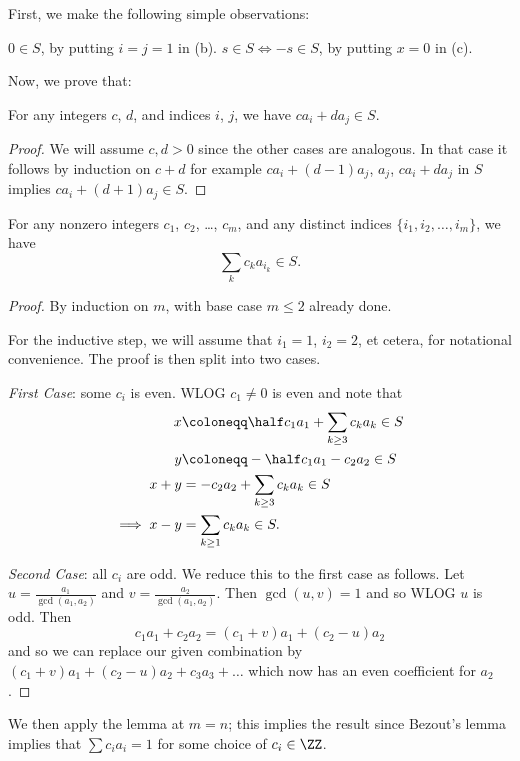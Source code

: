 \documentclass[11pt]{scrartcl}
\begin{document}
First, we make the following simple observations:
\begin{itemize}
  \ii $0 \in S$, by putting $i=j=1$ in (b).
  \ii $s \in S \iff -s \in S$, by putting $x=0$ in (c).
\end{itemize}

Now, we prove that:
\begin{lemma*}
  For any integers $c$, $d$, and indices $i$, $j$,
  we have $ca_i + da_j \in S$.
\end{lemma*}
\begin{proof}
  We will assume $c,d > 0$ since the other cases are analogous.
  In that case it follows by induction on $c+d$
  for example $ca_i + (d-1)a_j$, $a_j$, $ca_i + da_j$ in $S$
  implies $ca_i + (d+1)a_j \in S$.
\end{proof}

\begin{lemma*}
  For any nonzero integers $c_1$, $c_2$, \dots, $c_m$,
  and any distinct indices $\{i_1 , i_2 , \dots , i_m\}$, we have
  \[ \sum_k c_k a_{i_k} \in S. \]
\end{lemma*}
\begin{proof}
  By induction on $m$, with base case $m \le 2$ already done.

  For the inductive step,
  we will assume that $i_1 = 1$, $i_2 = 2$, et cetera,
  for notational convenience.
  The proof is then split into two cases.


  \emph{First Case}: some $c_i$ is even.
  WLOG $c_1 \neq 0$ is even and note that
  \begin{align*}
    x &\coloneqq \half c_1 a_1 + \sum_{k \ge 3} c_k a_k \in S \\
    y &\coloneqq -\half c_1 a_1 - c_2 a_2 \in S \\
    x+y &= -c_2 a_2 + \sum_{k \ge 3} c_k a_k \in S \\
    \implies x-y &= \sum_{k \ge 1} c_k a_k \in S.
  \end{align*}


  \emph{Second Case}: all $c_i$ are odd.
  We reduce this to the first case as follows.
  Let $u = \frac{a_1}{\gcd(a_1, a_2)}$ and $v = \frac{a_2}{\gcd(a_1, a_2)}$.
  Then $\gcd(u,v) = 1$ and so WLOG $u$ is odd.
  Then
  \[
    c_1 a_1 + c_2 a_2
    = (c_1 + v)a_1 + (c_2 - u) a_2
  \]
  and so we can replace our given combination
  by $(c_1+v)a_1 + (c_2-u)a_2 + c_3a_3 + \dots$
  which now has an even coefficient for $a_2$.
\end{proof}

We then apply the lemma at $m = n$;
this implies the result since Bezout's lemma
implies that $\sum c_i a_i = 1$ for some choice of $c_i \in \ZZ$.
\pagebreak
\end{document}
